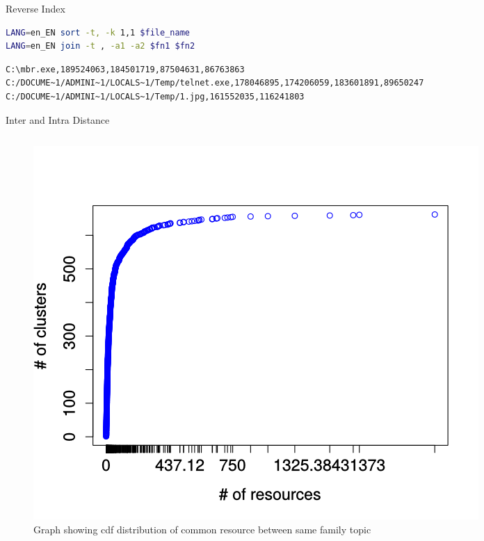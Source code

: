 \documentclass{beamer}
\begin{document}
\appendix
\begin{frame}{Reverse Index}
\begin{lstlisting}[numbers=none,language=bash,caption={Sort and join the reverse index}]
LANG=en_EN sort -t, -k 1,1 $file_name
LANG=en_EN join -t , -a1 -a2 $fn1 $fn2
\end{lstlisting}
\begin{lstlisting}[numbers=none,caption={Sample of reverse index created for File activity},label={lst:reverseindex}]
C:\mbr.exe,189524063,184501719,87504631,86763863
C:/DOCUME~1/ADMINI~1/LOCALS~1/Temp/telnet.exe,178046895,174206059,183601891,89650247
C:/DOCUME~1/ADMINI~1/LOCALS~1/Temp/1.jpg,161552035,116241803
\end{lstlisting}
\end{frame}
\begin{frame}[plain]{Inter and Intra Distance}
\begin{columns}
  \begin{column}{5cm}
    \begin{figure}[H]
      \begin{center}
        \includegraphics[scale=0.3]{figures/intra_clustered_common.png}
      \end{center}
      \captionsetup{font=small}
      \caption{ Graph showing cdf distribution of common resource between same family topic}
    \end{figure}
  \end{column}
  \begin{column}{5cm}

\end{column}
\end{columns}
\end{frame}
\end{document}
